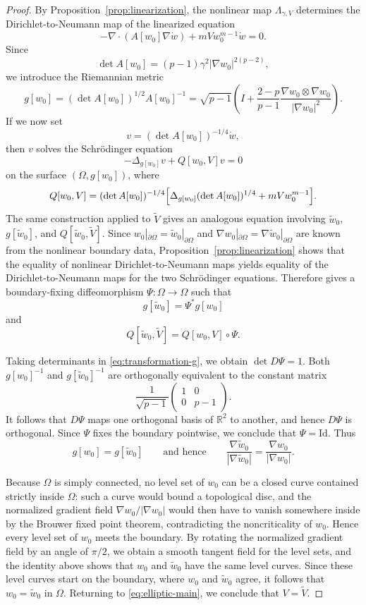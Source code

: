 \documentclass[a4paper,12pt]{article}
\newcommand{\pr}{\partial}
\newcommand{\R}{\mathbb{R}}
\theoremstyle{definition}
\theoremstyle{remark}
\begin{document}
\begin{proof}
By Proposition~\ref{prop:linearization}, the nonlinear map $\Lambda_{\gamma,V}$ determines the Dirichlet-to-Neumann map of the linearized equation
\[
-\nabla\cdot(A[w_0]\nabla \dot w)+mVw_0^{m-1}\dot w=0.
\]
Since
\[
\det A[w_0]=(p-1)\gamma^2|\nabla w_0|^{2(p-2)},
\]
we introduce the Riemannian metric
\[
g[w_0]=(\det A[w_0])^{1/2}A[w_0]^{-1}
=\sqrt{p-1}\left(I+\frac{2-p}{p-1}\frac{\nabla w_0\otimes \nabla w_0}{|\nabla w_0|^2}\right).
\]
If we now set
\[
v=(\det A[w_0])^{-1/4}\dot w,
\]
then $v$ solves the Schr\"odinger equation
\begin{equation}\label{eq:surf-schrod}
-\Delta_{g[w_0]}v+Q[w_0,V]v=0
\end{equation}
on the surface $(\Omega,g[w_0])$, where
\[
Q[w_0,V]=(\det A[w_0])^{-1/4}\Bigl[\Delta_{g[w_0]}(\det A[w_0])^{1/4}+mVw_0^{m-1}\Bigr].
\]
The same construction applied to $\tilde V$ gives an analogous equation involving $\tilde w_0$, $g[\tilde w_0]$, and $Q[\tilde w_0,\tilde V]$. Since $w_0|_{\pr\Omega}=\tilde w_0|_{\pr\Omega}$ and $\nabla w_0|_{\pr\Omega}=\nabla \tilde w_0|_{\pr\Omega}$ are known from the nonlinear boundary data, Proposition~\ref{prop:linearization} shows that the equality of nonlinear Dirichlet-to-Neumann maps yields equality of the Dirichlet-to-Neumann maps for the two Schr\"odinger equations. Therefore \cite[Theorem 1.1]{CarLiiTzo} gives a boundary-fixing diffeomorphism $\Psi:\Omega\to\Omega$ such that
\begin{equation}\label{eq:transformation-g}
g[\tilde w_0]=\Psi^*g[w_0]
\end{equation}
and
\[
Q[\tilde w_0,\tilde V]=Q[w_0,V]\circ\Psi.
\]

Taking determinants in \eqref{eq:transformation-g}, we obtain $\det D\Psi=1$. Both $g[w_0]^{-1}$ and $g[\tilde w_0]^{-1}$ are orthogonally equivalent to the constant matrix
\[
\frac{1}{\sqrt{p-1}}\begin{pmatrix}1&0\\0&p-1\end{pmatrix}.
\]
It follows that $D\Psi$ maps one orthogonal basis of $\R^2$ to another, and hence $D\Psi$ is orthogonal. Since $\Psi$ fixes the boundary pointwise, we conclude that $\Psi=\mathrm{Id}$. Thus
\[
g[w_0]=g[\tilde w_0]
\qquad\text{and hence}\qquad
\frac{\nabla \tilde w_0}{|\nabla \tilde w_0|}=\frac{\nabla w_0}{|\nabla w_0|}.
\]

Because $\Omega$ is simply connected, no level set of $w_0$ can be a closed curve contained strictly inside $\Omega$: such a curve would bound a topological disc, and the normalized gradient field $\nabla w_0/|\nabla w_0|$ would then have to vanish somewhere inside by the Brouwer fixed point theorem, contradicting the noncriticality of $w_0$. Hence every level set of $w_0$ meets the boundary. By rotating the normalized gradient field by an angle of $\pi/2$, we obtain a smooth tangent field for the level sets, and the identity above shows that $w_0$ and $\tilde w_0$ have the same level curves. Since these level curves start on the boundary, where $w_0$ and $\tilde w_0$ agree, it follows that $w_0=\tilde w_0$ in $\Omega$. Returning to \eqref{eq:elliptic-main}, we conclude that $V=\tilde V$.
\end{proof}
\end{document}
